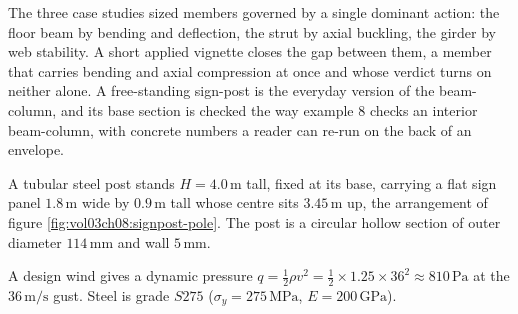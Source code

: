 The three case studies sized members governed by a single dominant action:
the floor beam by bending and deflection, the strut by axial buckling, the
girder by web stability. A short applied vignette closes the gap between
them, a member that carries bending and axial compression at once and
whose verdict turns on neither alone. A free-standing sign-post is the
everyday version of the beam-column, and its base section is checked the
way example 8 checks an interior beam-column, with concrete numbers a
reader can re-run on the back of an envelope.

A tubular steel post stands $H = 4.0\,\si{\meter}$ tall, fixed at its
base, carrying a flat sign panel $1.8\,\si{\meter}$ wide by
$0.9\,\si{\meter}$ tall whose centre sits $3.45\,\si{\meter}$ up, the
arrangement of figure \ref{fig:vol03ch08:signpost-pole}. The post is a
circular hollow section of outer diameter $114\,\si{\milli\meter}$ and
wall $5\,\si{\milli\meter}$.



A design wind gives a dynamic pressure
$q = \tfrac12\rho v^2 = \tfrac12 \times 1.25 \times 36^2 \approx
810\,\text{Pa}$ at the $36\,\si{\meter\per\second}$ gust. Steel is grade
$S275$ ($\sigma_y = 275\,\text{MPa}$, $E = 200\,\text{GPa}$).

